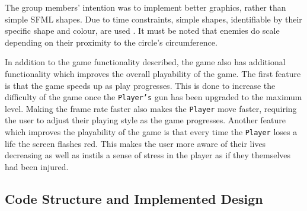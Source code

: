 \documentclass[10pt,twocolumn]{witseiepaper}
\begin{document}
The group members' intention was to implement better graphics, rather than simple SFML shapes. Due to time constraints, simple shapes, identifiable by their specific shape and colour, are used . It must be noted that enemies do scale depending on their proximity to the circle's circumference.

In addition to the game functionality described, the game also has additional functionality which improves the overall playability of the game. The first feature is that the game speeds up as play progresses. This is done to increase the difficulty of the game once the \texttt{Player's} gun has been upgraded to the maximum level. Making the frame rate faster also makes the \texttt{Player} move faster, requiring the user to adjust their playing style as the game progresses. Another feature which improves the playability of the game is that every time the \texttt{Player} loses a life the screen flashes red. This makes the user more aware of their lives decreasing as well as instils a sense of stress in the player as if they themselves had been injured. 

\subsection{Code Structure and Implemented Design}\label{critical_code_structure}






\end{document}
